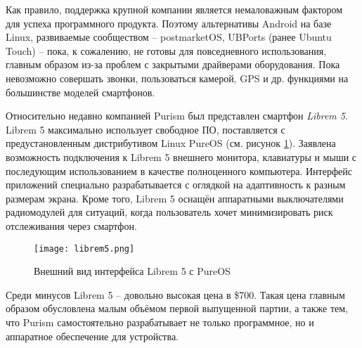 Как правило, поддержка крупной компании является немаловажным фактором для успеха программного продукта.
Поэтому альтернативы Android на базе Linux, развиваемые сообществом -- postmarketOS, UBPorts (ранее Ubuntu Touch) -- пока, к сожалению, не готовы для повседневного использования, главным образом из-за проблем с закрытыми драйверами оборудования.
Пока невозможно совершать звонки, пользоваться камерой, GPS и др. функциями на большинстве моделей смартфонов.

Относительно недавно компанией Purism был представлен смартфон \textit{Librem 5}.
Librem 5 максимально использует свободное ПО, поставляется с предустановленным дистрибутивом Linux PureOS (см. рисунок \ref{fig:librem5}).
Заявлена возможность подключения к Librem 5 внешнего монитора, клавиатуры и мыши с последующим использованием в качестве полноценного компьютера.
Интерфейс приложений специально разрабатывается с оглядкой на адаптивность к разным размерам экрана.
Кроме того, Librem 5 оснащён аппаратными выключателями радиомодулей для ситуаций, когда пользователь хочет минимизировать риск отслеживания через смартфон.

\begin{figure}[ht]
    \centering
    \texttt{[image: librem5.png]}  
    \caption{Внешний вид интерфейса Librem 5 с PureOS}
	\label{fig:librem5}
\end{figure}

Среди минусов Librem 5 -- довольно высокая цена в \$700.
Такая цена главным образом обусловлена малым объёмом первой выпущенной партии, а также тем, что Purism самостоятельно разрабатывает не только программное, но и аппаратное обеспечение для устройства.
